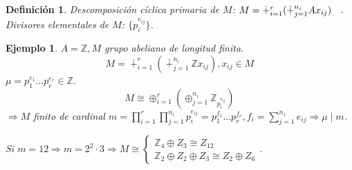 \documentclass[11pt,a4paper]{article}
\theoremstyle{break}
\newtheorem{example}[theorem]{Ejemplo}
\newtheorem{definition}[theorem]{Definición}
\begin{document}
\begin{definition}
Descomposición cíclica primaria de $M$: $M = \dotplus_{i=1}^{r} (\dotplus_{j=1}^{n_{i}} Ax_{ij}) \hspace{0.3cm}$. \\
Divisores elementales de $M$: $\{p_{i}^{e_{ij}}\}$.
\end{definition}

\begin{example}
$A = \mathbb{Z}, M$ grupo abeliano de longitud finita.
$$M = \dotplus_{i=1}^{r} (\dotplus_{j=1}^{n_{i}} \mathbb{Z} x_{ij}), x_{ij} \in M$$
$\mu = p_{1}^{e_{1}} \dots p_{r}^{e_{r}} \in \mathbb{Z}$.
$$M \cong \oplus_{i=1}^{r} (\oplus_{j=1}^{n_{i}} \mathbb{Z}_{p_{i}^{e_{ij}}})$$
$\Rightarrow M$ finito de cardinal $m = \prod_{i=1}^{r} \prod_{j=1}^{n_{i}} p_{i}^{e_{ij}} = p_{1}^{f_{1}} \dots p_{r}^{f_{r}}, f_{i} = \sum_{j=1}^{n_{1}} e_{ij} \Rightarrow \mu \mid m$.

Si $m = 12 \Rightarrow m = 2^{2} \cdot 3 \Rightarrow M \cong
\begin{cases}
\mathbb{Z}_{4} \oplus Z_{3} \cong Z_{12} \\
\mathbb{Z}_{2} \oplus Z_{2} \oplus Z_{3} \cong Z_{2} \oplus Z_{6}
\end{cases}$.
\end{example}
\end{document}
